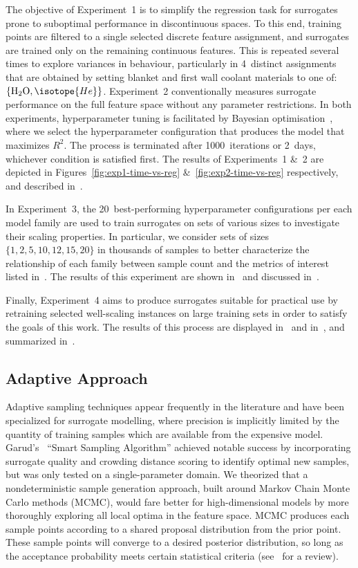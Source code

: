 The objective of Experiment~1 is to simplify the regression task for
surrogates prone to suboptimal performance in discontinuous spaces.
To this end, training points are filtered to a single selected discrete feature
assignment, and surrogates are trained only on the remaining continuous features.
This is repeated several times to explore variances in behaviour,
particularly in 4~distinct assignments that are obtained by setting blanket and
first wall coolant materials to one
of:~$\{\text{H\textsubscript{2}O},\isotope{He}\}$.
Experiment~2 conventionally measures surrogate performance on the full feature
space without any parameter restrictions. In both experiments, hyperparameter tuning is
facilitated by Bayesian optimisation~\cite{movckus1975bayesian}, where we select the
hyperparameter configuration that produces the model that maximizes $R^2$. The
process is terminated after 1000~iterations or 2~days, whichever condition is satisfied first.
The results of Experiments~1 \&~2 are depicted
in Figures~\ref{fig:exp1-time-vs-reg} \&~\ref{fig:exp2-time-vs-reg}
respectively, and described in~.

In Experiment~3, the 20~best-performing hyperparameter configurations
per each model family are used to train surrogates on sets of various sizes to
investigate their scaling properties. In particular, we consider sets of
sizes~$\{1,2,5,10,12,15,20\}$ in thousands of samples to better characterize the
relationship of each family between sample count and the metrics of interest
listed in~.
The results of this experiment are shown in~ and discussed
in~.

Finally, Experiment~4 aims
to produce surrogates suitable for practical use by retraining selected
well-scaling instances on large training sets in order to satisfy the goals of this work.
The results of this process are displayed in~ and
in~, and summarized in~.


\subsection{Adaptive Approach}\label{sec:adaptive}

Adaptive sampling techniques appear frequently in the literature and have been
specialized for surrogate modelling, where precision is implicitly limited by the quantity of training samples which are available from the expensive model. Garud's~\cite{Garud2016} ``Smart Sampling Algorithm'' achieved notable success by incorporating surrogate quality and
crowding distance scoring to identify optimal new samples, but was only tested
on a single-parameter domain. We theorized that a nondeterministic sample
generation approach, built around Markov Chain Monte Carlo methods (MCMC), would
fare better for high-dimensional models by more thoroughly exploring all local
optima in the feature space. MCMC produces each sample points according to a shared proposal
distribution from the prior point. These sample points will converge to a desired posterior
distribution, so long as the acceptance probability meets certain statistical criteria (see~\cite{Zhou2018} for a review).

